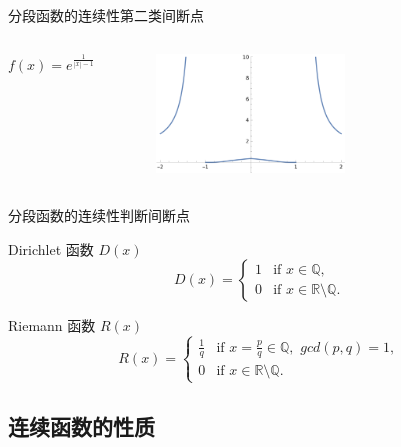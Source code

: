 \documentclass[
10pt,
aspectratio=43,
]{beamer}
\begin{document}
\begin{frame}{分段函数的连续性}{第二类间断点}
	\begin{columns}[onlytextwidth]
		\[
			f(x) = e^{\frac{1}{|x|-1}}
			\]
		\begin{figure}
			\centering
			\includegraphics[width=5cm]{Exp[1/(Abs[x]-1)}
		\end{figure}
	\end{columns}
\end{frame}

\begin{frame}{分段函数的连续性}{判断间断点}
\begin{exampleblock}{Dirichlet 函数 $D(x)$}
	\[
		D(x) = \begin{cases}
		1 & \text{if } x \in \mathbb{Q}, \\
		0 & \text{if } x \in \mathbb{R} \setminus \mathbb{Q}.
		\end{cases}
		\]

\end{exampleblock}
\begin{exampleblock}{Riemann 函数 $R(x)$}
	\[
		R(x) = \begin{cases}
			\displaystyle\frac1q & \text{if } x = \displaystyle\frac{p}{q}\in \mathbb{Q},\,\,gcd(p,q)=1, \\
		0 & \text{if } x \in \mathbb{R} \setminus \mathbb{Q}.
		\end{cases}
		\]

\end{exampleblock}

\end{frame}


	


\subsection{连续函数的性质}
\end{document}
